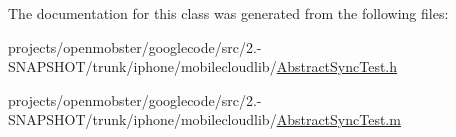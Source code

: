 \-The documentation for this class was generated from the following files\-:\begin{DoxyCompactItemize}
\item 
projects/openmobster/googlecode/src/2.-\/\-S\-N\-A\-P\-S\-H\-O\-T/trunk/iphone/mobilecloudlib/\hyperlink{_abstract_sync_test_8h}{\-Abstract\-Sync\-Test.\-h}\item 
projects/openmobster/googlecode/src/2.-\/\-S\-N\-A\-P\-S\-H\-O\-T/trunk/iphone/mobilecloudlib/\hyperlink{_abstract_sync_test_8m}{\-Abstract\-Sync\-Test.\-m}\end{DoxyCompactItemize}
